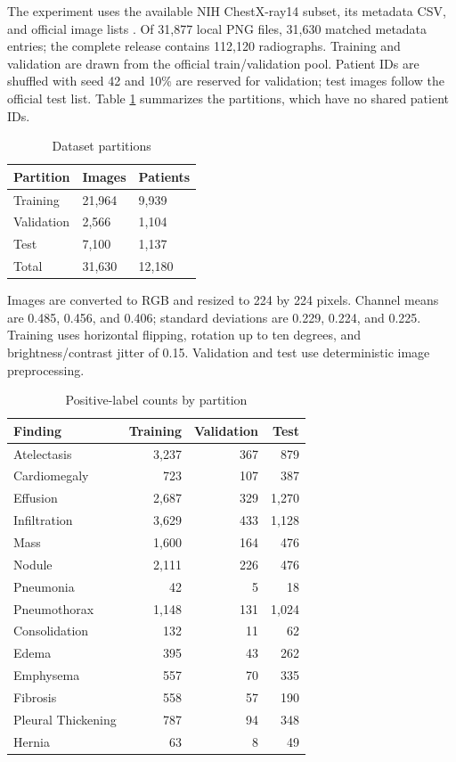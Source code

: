 \documentclass[conference,letterpaper]{IEEEtran}
\begin{document}
The experiment uses the available NIH ChestX-ray14 subset, its metadata CSV, and official image lists \cite{wang2017,nihdataset}. Of 31,877 local PNG files, 31,630 matched metadata entries; the complete release contains 112,120 radiographs. Training and validation are drawn from the official train/validation pool. Patient IDs are shuffled with seed 42 and 10\% are reserved for validation; test images follow the official test list. Table \ref{tab:split} summarizes the partitions, which have no shared patient IDs.

\begin{table}[t]\caption{Dataset partitions}\label{tab:split}\centering\footnotesize\begin{tabular}{@{}p{}p{}p{}@{}}\toprule Partition & Images & Patients\\\midrule Training & 21,964 & 9,939\\Validation & 2,566 & 1,104\\Test & 7,100 & 1,137\\Total & 31,630 & 12,180\\\bottomrule\end{tabular}\end{table}

Images are converted to RGB and resized to 224 by 224 pixels. Channel means are 0.485, 0.456, and 0.406; standard deviations are 0.229, 0.224, and 0.225. Training uses horizontal flipping, rotation up to ten degrees, and brightness/contrast jitter of 0.15. Validation and test use deterministic image preprocessing.

\begin{table}[t]\caption{Positive-label counts by partition}\label{tab:prevalence}\centering\footnotesize
\begin{tabular}{@{}lrrr@{}}\toprule Finding & Training & Validation & Test\\\midrule
Atelectasis & 3,237 & 367 & 879\\
Cardiomegaly & 723 & 107 & 387\\
Effusion & 2,687 & 329 & 1,270\\
Infiltration & 3,629 & 433 & 1,128\\
Mass & 1,600 & 164 & 476\\
Nodule & 2,111 & 226 & 476\\
Pneumonia & 42 & 5 & 18\\
Pneumothorax & 1,148 & 131 & 1,024\\
Consolidation & 132 & 11 & 62\\
Edema & 395 & 43 & 262\\
Emphysema & 557 & 70 & 335\\
Fibrosis & 558 & 57 & 190\\
Pleural Thickening & 787 & 94 & 348\\
Hernia & 63 & 8 & 49\\
\bottomrule\end{tabular}\end{table}
\end{document}
